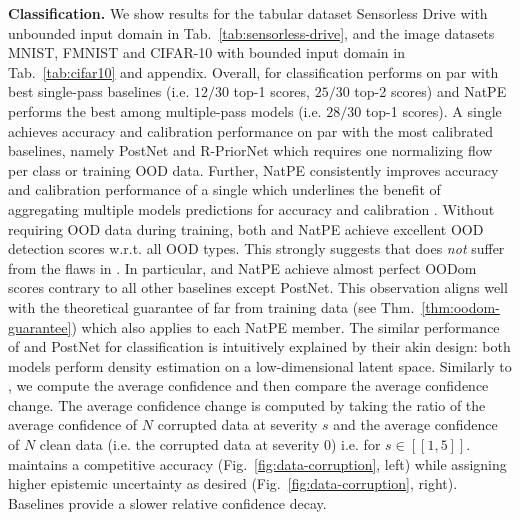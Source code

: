 \textbf{Classification.} We show results for the tabular dataset Sensorless Drive with unbounded input domain in Tab.~\ref{tab:sensorless-drive}, and the image datasets MNIST, FMNIST and CIFAR-10 with bounded input domain in Tab.~\ref{tab:cifar10} and appendix. Overall, for classification \NatPNacro{} performs on par with best single-pass baselines (i.e. $12/30$ top-1 scores, $25/30$ top-2 scores) and NatPE performs the best among multiple-pass models (i.e. $28/30$ top-1 scores). A single \NatPNacro{} achieves accuracy and calibration performance on par with the most calibrated baselines, namely PostNet and R-PriorNet which requires one normalizing flow per class or training OOD data. Further, NatPE consistently improves accuracy and calibration performance of a single \NatPNacro{} which underlines the benefit of aggregating multiple models predictions for accuracy and calibration \citep{ensembles}. Without requiring OOD data during training, both \NatPNacro{} and NatPE achieve excellent OOD detection scores w.r.t. all OOD types. This strongly suggests that \NatPNacro{} does \emph{not} suffer from the flaws in \citet{anomaly-detection,deep-generative,typicality_OOD_generative}. In particular, \NatPNacro{} and NatPE achieve almost perfect OODom scores contrary to all other baselines except PostNet. This observation aligns well with the theoretical guarantee of \NatPNacro{} far from training data (see Thm.~\ref{thm:oodom-guarantee}) which also applies to each NatPE member. The similar performance of \NatPNacro{} and PostNet for classification is intuitively explained by their akin design: both models perform density estimation on a low-dimensional latent space. Similarly to \cite{postnet}, we compute the average confidence  and then compare the average confidence change. The average confidence change is computed by taking the ratio of the average confidence of $N$ corrupted data at severity $s$ and the average confidence of $N$ clean data (i.e. the corrupted data at severity $0$) i.e.  for $s \in [\![ 1, 5 ]\!]$. \NatPNacro{} maintains a competitive accuracy (Fig.~\ref{fig:data-corruption}, left) while assigning higher epistemic uncertainty as desired (Fig.~\ref{fig:data-corruption}, right). Baselines provide a slower relative confidence decay.

